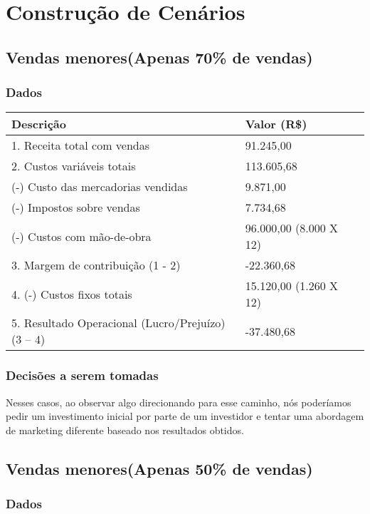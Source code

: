 \chapter{Construção de Cenários}

\section{Vendas menores(Apenas 70\% de vendas)}

\subsection{Dados}
  
\begin{tabular}{| l | l | l |}
  \hline
  \textbf{Descrição} & \textbf{Valor (R\$)}\\ \hline
  1. Receita total com vendas & 91.245,00\\ \hline \hline
  2. Custos variáveis totais & 113.605,68\\ \hline
  (-) Custo das mercadorias vendidas & 9.871,00\\ \hline
  (-) Impostos sobre vendas & 7.734,68\\ \hline
  (-) Custos com mão-de-obra & 96.000,00 (8.000 X 12)\\ \hline \hline
  3. Margem de contribuição (1 - 2) & -22.360,68\\ \hline \hline
  4. (-) Custos fixos totais & 15.120,00 (1.260 X 12)\\ \hline \hline 
  5. Resultado Operacional (Lucro/Prejuízo) (3 – 4) & -37.480,68\\ \hline
\end{tabular}

\subsection{Decisões a serem tomadas}
Nesses casos, ao observar algo direcionando para esse caminho, nós poderíamos pedir um investimento inicial por parte de um investidor e tentar uma abordagem de marketing diferente baseado nos resultados obtidos.

\section{Vendas menores(Apenas 50\% de vendas)}

\subsection{Dados}
  
